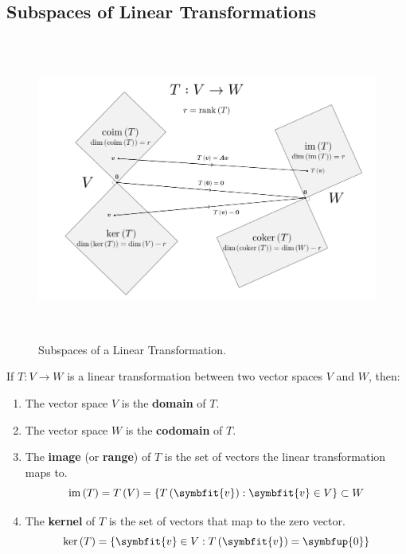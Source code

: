 \documentclass{article}
\begin{document}
\subsection{Subspaces of Linear Transformations}
\begin{figure}[H]
    \centering
    \includegraphics[height=10cm, keepaspectratio]{figures/matrix_transformation}
    \caption{Subspaces of a Linear Transformation.}
\end{figure}
\begin{definition}
    If \(T:V \rightarrow W\) is a linear transformation between two
    vector spaces \(V\) and \(W\), then:
    \begin{enumerate}
        \item The vector space \(V\) is the \textbf{domain} of \(T\).
        \item The vector space \(W\) is the \textbf{codomain} of \(T\).
        \item The \textbf{image} (or \textbf{range}) of \(T\) is the set
              of vectors the linear transformation maps to.
              \begin{equation*}
                  \vim{\left( T \right)} = T\left(V\right) = \left\{ T\left(\symbfit{v}\right) : \symbfit{v}\in V \right\} \subset W
              \end{equation*}
        \item The \textbf{kernel} of \(T\) is the set of vectors that
              map to the zero vector.
              \begin{equation*}
                  \vker{\left( T \right)} = \left\{ \symbfit{v}\in V : T\left(\symbfit{v}\right)=\symbfup{0} \right\}
              \end{equation*}
    \end{enumerate}
\end{definition}
\end{document}

